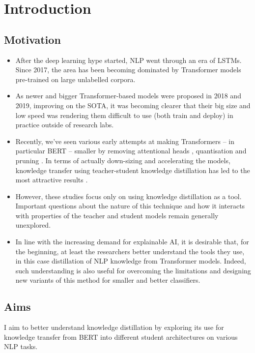 \documentclass[bsc,frontabs,twoside,singlespacing,parskip,deptreport]{infthesis}
\begin{document}
\chapter{Introduction}{
  \section{Motivation}{
    \begin{itemize}
      \item After the deep learning hype started, NLP went through an era of LSTMs. Since 2017, the area has been becoming dominated by Transformer models pre-trained on large unlabelled corpora.
      
      \item As newer and bigger Transformer-based models were proposed in 2018 and 2019, improving on the SOTA, it was becoming clearer that their big size and low speed was rendering them difficult to use (both train and deploy) in practice outside of research labs.
      
      \item Recently, we've seen various early attempts at making Transformers -- in particular BERT \citep{Devlin_2018} -- smaller by removing attentional heads \citep{Michel_2019}, quantisation and pruning \citep{Cheong_2019, Sucik_2019}. In terms of actually down-sizing and accelerating the models, knowledge transfer using teacher-student knowledge distillation has led to the most attractive results \citep{Mukherjee_2019,Tang_2019a,Jiao_2019,Sanh_2019}.
      
      \item However, these studies focus only on using knowledge distillation as a tool. Important questions about the nature of this technique and how it interacts with properties of the teacher and student models remain generally unexplored.
      
      \item In line with the increasing demand for explainable AI, it is desirable that, for the beginning, at least the researchers better understand the tools they use, in this case distillation of NLP knowledge from Transformer models. Indeed, such understanding is also useful for overcoming the limitations and designing new variants of this method for smaller and better classifiers.
    \end{itemize}
  }
  
  \section{Aims}{
    I aim to better understand knowledge distillation by exploring its use for knowledge transfer from BERT into different student architectures on various NLP tasks.

}}
\end{document}
